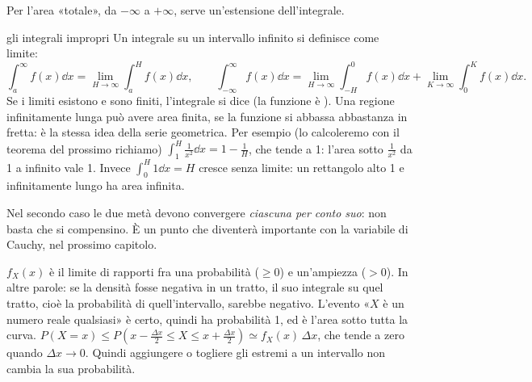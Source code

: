 Per l'area «totale», da $-\infty$ a $+\infty$, serve un'estensione dell'integrale.

\begin{richiamo}{gli integrali impropri}
Un integrale su un intervallo infinito si definisce come limite:
\[ \int_a^{\infty} f(x) \dd x = \lim_{H \to \infty} \int_a^H f(x) \dd x , \qquad
   \int_{-\infty}^{\infty} f(x) \dd x = \lim_{H \to \infty} \int_{-H}^{0} f(x) \dd x + \lim_{K \to \infty} \int_0^K
   f(x) \dd x . \]
Se i limiti esistono e sono finiti, l'integrale si dice  (la funzione è ). Una regione
infinitamente lunga può avere area finita, se la funzione si abbassa abbastanza in fretta: è la stessa idea della
serie geometrica. Per esempio (lo calcoleremo con il teorema del prossimo richiamo)
$\int_1^H \frac{1}{x^2} \dd x = 1 - \frac1H$, che tende a 1: l'area sotto $\frac{1}{x^2}$ da 1 a infinito vale 1.
Invece $\int_0^H 1 \dd x = H$ cresce senza limite: un rettangolo alto 1 e infinitamente lungo ha area infinita.

Nel secondo caso le due metà devono convergere \emph{ciascuna per conto suo}: non basta che si compensino. È un punto
che diventerà importante con la variabile di Cauchy, nel prossimo capitolo.
\end{richiamo}


\begin{dimostrazione}
 $f_X(x)$ è il limite di rapporti fra una probabilità ($\geq 0$) e un'ampiezza ($> 0$). In altre
parole: se la densità fosse negativa in un tratto, il suo integrale su quel tratto, cioè la probabilità di
quell'intervallo, sarebbe negativo.
 L'evento «$X$ è un numero reale qualsiasi» è certo, quindi ha probabilità 1, ed è l'area sotto
tutta la curva.
 $P(X = x) \leq P\left( x - \frac{\Delta x}{2} \leq X \leq x + \frac{\Delta x}{2} \right) \simeq
f_X(x)\, \Delta x$, che tende a zero quando $\Delta x \to 0$. Quindi aggiungere o togliere gli estremi a un intervallo
non cambia la sua probabilità.
\end{dimostrazione}


